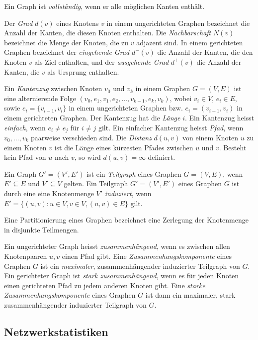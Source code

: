 Ein Graph ist \emph{vollst\"andig}, wenn er alle m\"oglichen Kanten
enth\"alt.

Der \emph{Grad} $d(v)$ eines Knotens $v$ in einem ungerichteten
Graphen bezeichnet die Anzahl der Kanten, die diesen Knoten
enthalten. Die \emph{Nachbarschaft} $N(v)$ bezeichnet die Menge der
Knoten, die zu $v$ adjazent sind. In einem gerichteten Graphen
bezeichnet der \emph{eingehende Grad} $d^{-}(v)$ die Anzahl der
Kanten, die den Knoten $v$ als Ziel enthalten, und der
\emph{ausgehende Grad} $d^{+}(v)$ die Anzahl der Kanten, die $v$ als
Ursprung enthalten.

Ein \emph{Kantenzug} zwischen Knoten $v_0$ und $v_k$ in einem Graphen
$G=(V, E)$ ist eine alternierende Folge $(v_0, e_1, v_1, e_2, \dots,
v_{k-1}, e_k, v_k)$, wobei $v_i \in V$, $e_i \in E$, sowie $e_i =
\{v_{i-1}, v_{i}\}$ in einem ungerichteten Graphen bzw. $e_i =
(v_{i-1}, v_{i})$ in einem gerichteten Graphen. Der Kantenzug hat die
\emph{L\"ange} $i$. Ein Kantenzug heisst \emph{einfach}, wenn $e_i \ne
e_j$ f\"ur $i \ne j$ gilt.  Ein einfacher Kantenzug heisst
\emph{Pfad}, wenn $v_0, \dots, v_k$ paarweise verschieden sind. Die
\emph{Distanz} $d(u, v)$ von einem Knoten $u$ zu einem Knoten $v$ ist die
L\"ange eines k\"urzesten Pfades zwischen $u$ und $v$. Besteht kein
Pfad von $u$ nach $v$, so wird $d(u,v) = \infty$ definiert.


Ein Graph $G' = (V', E')$ ist ein \emph{Teilgraph} eines Graphen $G =
(V, E)$, wenn $E' \subseteq E$ und $V' \subseteq V$ gelten. Ein
Teilgraph $G' = (V', E')$ eines Graphen $G$ ist durch eine eine
Knotenmenge $V'$ \emph{induziert}, wenn $E' = \{(u, v) : u \in V, v
\in V, (u, v) \in E\}$ gilt.

Eine Partitionierung eines Graphen bezeichnet eine Zerlegung der
Knotenmenge in disjunkte Teilmengen.

Ein ungerichteter Graph heisst \emph{zusammenh\"angend}, wenn es
zwischen allen Knotenpaaren $u, v$ einen Pfad gibt. Eine
\emph{Zusammenhangskomponente} eines Graphen $G$ ist ein
\emph{maximaler}, zusammenh\"angender induzierter Teilgraph von
$G$. Ein gerichteter Graph ist \emph{stark zusammenh\"angend}, wenn es
f\"ur jeden Knoten einen gerichteten Pfad zu jedem anderen Knoten gibt. Eine
\emph{starke Zusammenhangskomponente} eines Graphen $G$ ist dann ein
maximaler, stark zusammenh\"angender induzierter Teilgraph von $G$.

\subsection{Netzwerkstatistiken}
\label{ch:Grundlagen:sec:Netzwerkanalyse:subsec:Statistiken}

